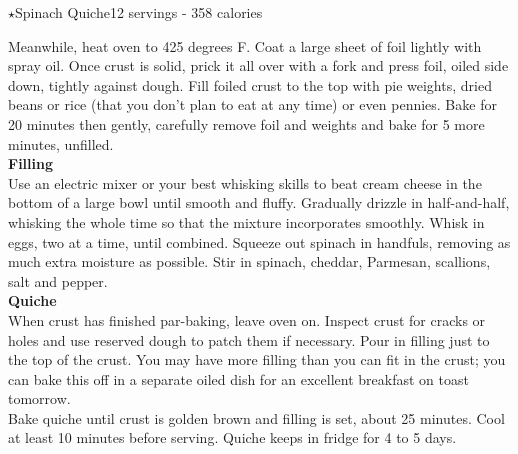 \begin{recipe}{\texorpdfstring{$\star$}{str}Spinach Quiche}{12 servings - 358 calories}{}
\newpage

Meanwhile, heat oven to 425 degrees F. Coat a large sheet of foil lightly with spray oil. Once crust is solid, prick it all over with a fork and press foil, oiled side down, tightly against dough. Fill foiled crust to the top with pie weights, dried beans or rice (that you don’t plan to eat at any time) or even pennies. Bake for 20 minutes then gently, carefully remove foil and weights and bake for 5 more minutes, unfilled.\\

\textbf{Filling}\\

Use an electric mixer or your best whisking skills to beat cream cheese in the bottom of a large bowl until smooth and fluffy. Gradually drizzle in half-and-half, whisking the whole time so that the mixture incorporates smoothly. Whisk in eggs, two at a time, until combined. Squeeze out spinach in handfuls, removing as much extra moisture as possible. Stir in spinach, cheddar, Parmesan, scallions, salt and pepper.\\

\textbf{Quiche}\\

When crust has finished par-baking, leave oven on. Inspect crust for cracks or holes and use reserved dough to patch them if necessary. Pour in filling just to the top of the crust. You may have more filling than you can fit in the crust; you can bake this off in a separate oiled dish for an excellent breakfast on toast tomorrow.\\

Bake quiche until crust is golden brown and filling is set, about 25 minutes. Cool at least 10 minutes before serving. Quiche keeps in fridge for 4 to 5 days.

\end{recipe}